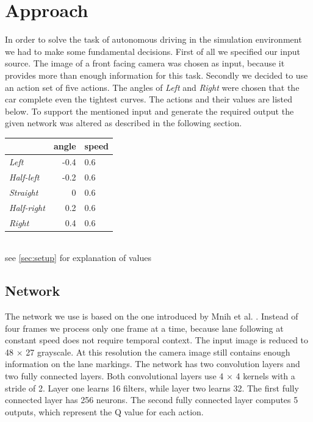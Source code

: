 
\section{Approach}\label{sec:approach}

In order to solve the task of autonomous driving in the simulation environment we had to make some fundamental decisions. First of all we specified our input source. The image of a front facing camera was chosen as input, because it provides more than enough information for this task. Secondly we decided to use an action set of five actions. The angles of \textit{Left} and \textit{Right} were chosen that the car complete even the tightest curves. The actions and their values are listed below. To support the mentioned input and generate the required output the given network was altered as described in the following section.
\begin{center}
	\begin{tabular}{ l | r | l }
							&	angle	& speed\\
		\hline
		\textit{Left} 		& 	-0.4 	& 0.6	\\
		\textit{Half-left} 	& 	-0.2 	& 0.6	\\
		\textit{Straight} 	& 	0 		& 0.6	\\
		\textit{Half-right} & 	0.2 	& 0.6	\\
		\textit{Right} 		& 	0.4 	& 0.6	\\
	\end{tabular}\\
	see \ref{sec:setup} for explanation of values
	\label{actionset}
\end{center}

\subsection{Network}
The network we use is based on the one introduced by Mnih et al. \cite{Mnih13}. Instead of four frames we process only one frame at a time, because lane following at constant speed does not require temporal context. The input image is reduced to 48 $\times$ 27 grayscale. At this resolution the camera image still contains enough information on the lane markings. The network has two convolution layers and two fully connected layers. Both convolutional layers use 4 $\times$ 4 kernels with a stride of 2. Layer one learns 16 filters, while layer two learns 32. The first fully connected layer has 256 neurons. The second fully connected layer computes 5 outputs, which represent the Q value for each action.

